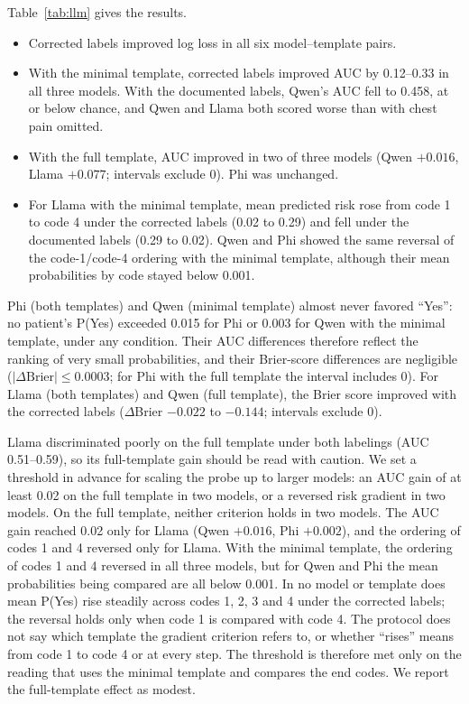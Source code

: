 \documentclass[11pt]{article}
\begin{document}
Table~\ref{tab:llm} gives the results.
\begin{itemize}
\item Corrected labels improved log loss in all six model--template pairs.
\item With the minimal template, corrected labels improved AUC by 0.12--0.33 in all three models. With the documented labels, Qwen's AUC fell to 0.458, at or below chance, and Qwen and Llama both scored worse than with chest pain omitted.
\item With the full template, AUC improved in two of three models (Qwen $+0.016$, Llama $+0.077$; intervals exclude 0). Phi was unchanged.
\item For Llama with the minimal template, mean predicted risk rose from code 1 to code 4 under the corrected labels (0.02 to 0.29) and fell under the documented labels (0.29 to 0.02). Qwen and Phi showed the same reversal of the code-1/code-4 ordering with the minimal template, although their mean probabilities by code stayed below 0.001.
\end{itemize}
Phi (both templates) and Qwen (minimal template) almost never favored ``Yes'': no patient's P(Yes) exceeded 0.015 for Phi or 0.003 for Qwen with the minimal template, under any condition. Their AUC differences therefore reflect the ranking of very small probabilities, and their Brier-score differences are negligible ($|\Delta\text{Brier}| \le 0.0003$; for Phi with the full template the interval includes 0). For Llama (both templates) and Qwen (full template), the Brier score improved with the corrected labels ($\Delta$Brier $-0.022$ to $-0.144$; intervals exclude 0).

Llama discriminated poorly on the full template under both labelings (AUC 0.51--0.59), so its full-template gain should be read with caution. We set a threshold in advance for scaling the probe up to larger models: an AUC gain of at least 0.02 on the full template in two models, or a reversed risk gradient in two models. On the full template, neither criterion holds in two models. The AUC gain reached 0.02 only for Llama (Qwen $+0.016$, Phi $+0.002$), and the ordering of codes 1 and 4 reversed only for Llama. With the minimal template, the ordering of codes 1 and 4 reversed in all three models, but for Qwen and Phi the mean probabilities being compared are all below 0.001. In no model or template does mean P(Yes) rise steadily across codes 1, 2, 3 and 4 under the corrected labels; the reversal holds only when code 1 is compared with code 4. The protocol does not say which template the gradient criterion refers to, or whether ``rises'' means from code 1 to code 4 or at every step. The threshold is therefore met only on the reading that uses the minimal template and compares the end codes. We report the full-template effect as modest.
\end{document}
